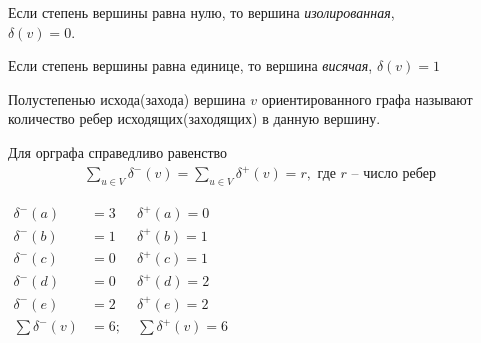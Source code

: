 \begin{definition}
    Если степень вершины равна нулю, то вершина \textit{изолированная}, \\ $\delta(v)=0$.
\end{definition}

\begin{definition}
    Если степень вершины равна единице, то вершина \textit{висячая}, $\delta(v)=1$
\end{definition}

\begin{definition}
    Полустепенью исхода(захода) вершина $v$ ориентированного графа называют количество ребер исходящих(заходящих) в данную вершину.
\end{definition}

\begin{theorem}
	Для орграфа справедливо равенство
	\begin{align*}
		\sum_{u \in V}\delta^-(v)=\sum_{u \in V}\delta^+(v)=r, \textit{ где r -- число ребер}
	\end{align*}
\end{theorem}

\begin{minipage}{0.5\textwidth}
	\centering
\end{minipage}
\begin{minipage}{0.5\textwidth}
	$\begin{aligned}
		\delta^-(a) &= 3 &\delta^+(a) = 0 \\
		\delta^-(b) &= 1 &\delta^+(b) = 1 \\
		\delta^-(c) &= 0 &\delta^+(c) = 1 \\
		\delta^-(d) &= 0 &\delta^+(d) = 2 \\
		\delta^-(e) &= 2 &\delta^+(e) = 2 \\
		\sum\delta^-(v) &= 6; \; &\sum\delta^+(v) = 6 \\
	\end{aligned}$
\end{minipage}

